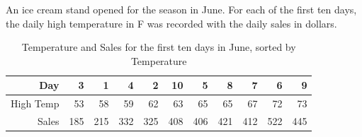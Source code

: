 \documentclass[addpoints,12pt]{exam}
\begin{document}
\begin{questions}
An ice cream stand opened for the season in June. For each of the first ten days, the daily high temperature in \textdegree F was recorded with the daily sales in dollars.
\begin{table}[ht]
\centering
\begin{tabular}{rrrrrrrrrrr}
  \hline
Day & 3 & 1 & 4 & 2 & 10 & 5 & 8 & 7 & 6 & 9 \\ 
  \hline
High Temp &  53 &  58 &  59 &  62 &  63 &  65 &  65 &  67 &  72 &  73 \\ 
  Sales & 185 & 215 & 332 & 325 & 408 & 406 & 421 & 412 & 522 & 445 \\ 
   \hline
\end{tabular}
\caption{Temperature and Sales for the first ten days in June, sorted by Temperature}
\end{table}
\vspace{1cm}
\end{questions}
\end{document}
